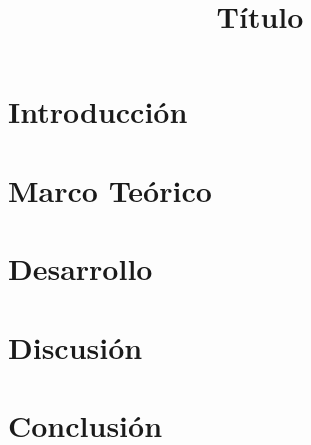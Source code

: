 \documentclass{plantillauft}
\title{Título} %
\begin{document}




        
\fairemarges 
\portada
\tableofcontents 


\newpage
\section{Introducción}


 
\bigskip
\newpage
\section{Marco Teórico}





\bigskip
\newpage
\section{Desarrollo}


\bigskip
\newpage
\section{Discusión}


 

\bigskip
\newpage
\section{Conclusión} 
\end{document}
